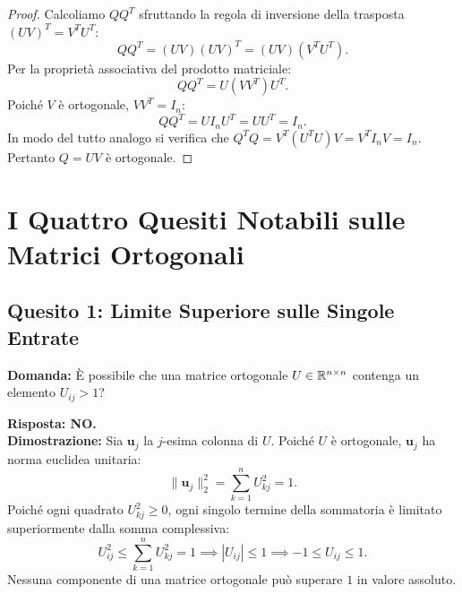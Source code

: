 \begin{proof}
Calcoliamo $Q Q^T$ sfruttando la regola di inversione della trasposta $(UV)^T = V^T U^T$:
\begin{equation}
    Q Q^T = (UV)(UV)^T = (UV)(V^T U^T).
\end{equation}
Per la propriet\`a associativa del prodotto matriciale:
\begin{equation}
    Q Q^T = U (V V^T) U^T.
\end{equation}
Poich\'e $V$ \`e ortogonale, $V V^T = I_n$:
\begin{equation}
    Q Q^T = U I_n U^T = U U^T = I_n.
\end{equation}
In modo del tutto analogo si verifica che $Q^T Q = V^T (U^T U) V = V^T I_n V = I_n$. Pertanto $Q = UV$ \`e ortogonale.
\end{proof}

\FloatBarrier
\section{I Quattro Quesiti Notabili sulle Matrici Ortogonali}

\subsection{Quesito 1: Limite Superiore sulle Singole Entrate}

\begin{example}
\textbf{Domanda:} \`E possibile che una matrice ortogonale $U \in \mathbb{R}^{n \times n}$ contenga un elemento $U_{ij} > 1$?

\textbf{Risposta: NO.} \\
\textbf{Dimostrazione:} Sia $\mathbf{u}_j$ la $j$-esima colonna di $U$. Poich\'e $U$ \`e ortogonale, $\mathbf{u}_j$ ha norma euclidea unitaria:
\begin{equation}
    \|\mathbf{u}_j\|_2^2 = \sum_{k=1}^n U_{kj}^2 = 1.
\end{equation}
Poich\'e ogni quadrato $U_{kj}^2 \ge 0$, ogni singolo termine della sommatoria \`e limitato superiormente dalla somma complessiva:
\begin{equation}
    U_{ij}^2 \le \sum_{k=1}^n U_{kj}^2 = 1 \implies |U_{ij}| \le 1 \implies -1 \le U_{ij} \le 1.
\end{equation}
Nessuna componente di una matrice ortogonale pu\`o superare $1$ in valore assoluto.
\end{example}

